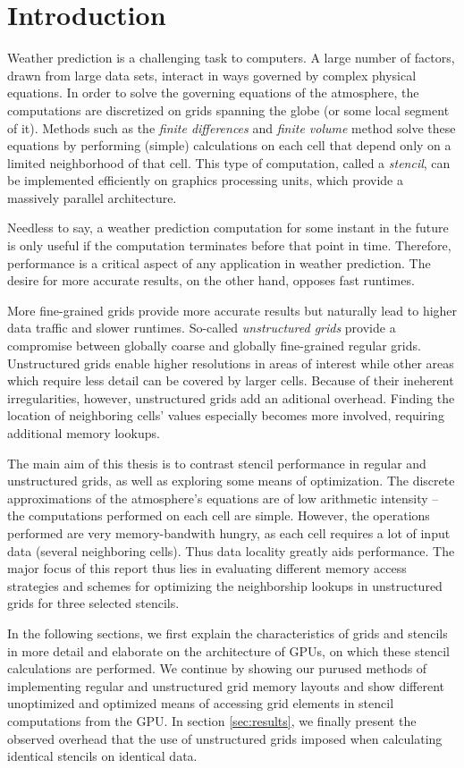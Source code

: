 \section{Introduction}

Weather prediction is a challenging task to computers. A large number of factors, drawn from large data sets, interact in ways governed by complex physical equations. In order to solve the governing equations of the atmosphere, the computations are discretized on grids spanning the globe (or some local segment of it). Methods such as the \emph{finite differences} and \emph{finite volume} method solve these equations by performing (simple) calculations on each cell that depend only on a limited neighborhood of that cell. This type of computation, called a \emph{stencil}, can be implemented efficiently on graphics processing units, which provide a massively parallel architecture. 

Needless to say, a weather prediction computation for some instant in the future is only useful if the computation terminates before that point in time. Therefore, performance is a critical aspect of any application in weather prediction. The desire for more accurate results, on the other hand, opposes fast runtimes.

More fine-grained grids provide more accurate results but naturally lead to higher data traffic and slower runtimes. So-called \emph{unstructured grids} provide a compromise between globally coarse and globally fine-grained regular grids. Unstructured grids enable higher resolutions in areas of interest while other areas which require less detail can be covered by larger cells. Because of their ineherent irregularities, however, unstructured grids add an aditional overhead. Finding the location of neighboring cells' values especially becomes more involved, requiring additional memory lookups.

The main aim of this thesis is to contrast stencil performance in regular and unstructured grids, as well as exploring some means of optimization. The discrete approximations of the atmosphere's equations are of low arithmetic intensity -- the computations performed on each cell are simple. However, the operations performed are very memory-bandwith hungry, as each cell requires a lot of input data (several neighboring cells). Thus data locality greatly aids performance. The major focus of this report thus lies in evaluating different memory access strategies and schemes for optimizing the neighborship lookups in unstructured grids for three selected stencils.

In the following sections, we first explain the characteristics of grids and stencils in more detail and elaborate on the architecture of GPUs, on which these stencil calculations are performed. We continue by showing our purused methods of implementing regular and unstructured grid memory layouts and show different unoptimized and optimized means of accessing grid elements in stencil computations from the GPU. In section \ref{sec:results}, we finally present the observed overhead that the use of unstructured grids imposed when calculating identical stencils on identical data.